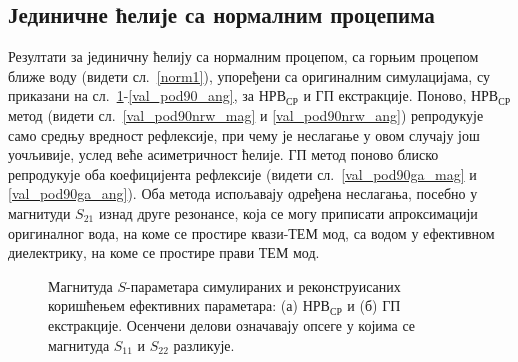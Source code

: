 \documentclass[main.tex]{subfiles}
\begin{document}
\subsection{Јединичне ћелије са нормалним процепима}
Резултати за јединичну ћелију са нормалним процепом, са горњим процепом ближе воду (видети сл.~\ref{norm1}), упоређени са оригиналним симулацијама, су приказани на сл.~\ref{val_pod90_mag}-\ref{val_pod90_ang}, за $НРВ_{СР}$ и ГП екстракције. Поново, $НРВ_{СР}$ метод (видети сл.~\ref{val_pod90nrw_mag} и \ref{val_pod90nrw_ang}) репродукује само средњу вредност рефлексије, при чему је неслагање у овом случају још уочљивије, услед веће асиметричност ћелије. ГП метод поново блиско репродукује оба коефицијента рефлексије (видети сл.~\ref{val_pod90ga_mag} и \ref{val_pod90ga_ang}). Оба метода испољавају одређена неслагања, посебно у магнитуди $S_{21}$ изнад друге резонансе, која се могу приписати апроксимацији оригиналног вода, на коме се простире квази-ТЕМ мод, са водом у ефективном диелектрику, на коме се простире прави ТЕМ мод.
\begin{figure}[!t]
\centering
{}\hfill
{}
\caption{Магнитуда $S$-параметара симулираних и реконструисаних коришћењем ефективних параметара: (а) $НРВ_{СР}$ и (б) ГП екстракције. Осенчени делови означавају опсеге у којима се магнитуда $S_{11}$ и $S_{22}$ разликује.}
\label{val_pod90_mag}
\end{figure}
\end{document}
